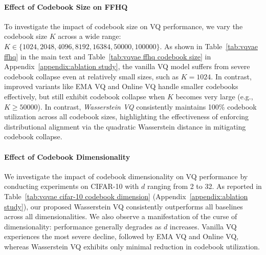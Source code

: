 \paragraph{Effect of Codebook Size on FFHQ} To investigate the impact of codebook size on VQ performance, we vary the codebook size $K$  across a wide range: $K \in \{1024, 2048, 4096, 8192, 16384, 50000, 100000\}$. As shown in Table~\ref{tab:vqvae ffhq} in the main text and Table~\ref{tab:vqvae ffhq codebook size} in Appendix~\ref{appendix:ablation study}, the vanilla VQ model suffers from severe codebook collapse even at relatively small sizes, such as $K=1024$. In contrast, improved variants like EMA VQ and Online VQ handle smaller codebooks effectively, but still exhibit codebook collapse when $K$ becomes very large (e.g., $K \geq 50000$).  In contrast, \emph{Wasserstein VQ} consistently maintains 100\% codebook utilization across all codebook sizes, highlighting the effectiveness of enforcing distributional alignment via the quadratic Wasserstein distance in mitigating codebook collapse.

\paragraph{Effect of Codebook Dimensionality} 
We investigate the impact of codebook dimensionality on VQ performance by conducting experiments on CIFAR-10 with $d$ ranging from 2 to 32. As reported in Table~\ref{tab:vqvae cifar-10 codebook dimension} (Appendix~\ref{appendix:ablation study}), our proposed Wasserstein VQ consistently outperforms all baselines across all dimensionalities. We also observe a manifestation of the curse of dimensionality: performance generally degrades as $d$ increases. Vanilla VQ experiences the most severe decline, followed by EMA VQ and Online VQ, whereas Wasserstein VQ exhibits only minimal reduction in codebook utilization.


